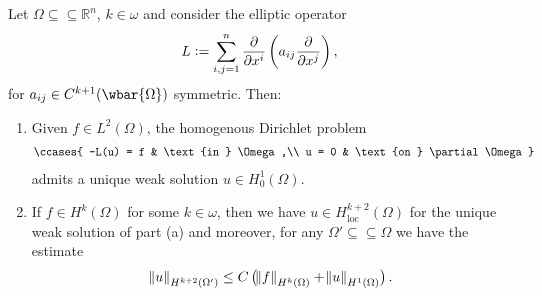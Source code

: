 \begin{theorem}
	Let $\Omega \subseteq\subseteq \mathbb{R}^n$, $k \in \omega$ and consider the elliptic operator
	\begin{equation*}
		L := \sum_{i,j = 1}^n \frac{\partial}{\partial x^i}\del[3]{a_{ij}\frac{\partial}{\partial x^j}},
	\end{equation*}
	\noindent for $a_{ij} \in C^{k + 1}(\wbar{\Omega})$ symmetric. Then:
	\begin{enumerate}[label = \textup{(}\alph*\textup{)},wide=0pt]
		\item Given $f \in L^2(\Omega)$, the homogenous Dirichlet problem
			\begin{align}
				\label{eq:HDP}
				\ccases{
					-L(u) = f & \text{in } \Omega,\\
					u = 0 & \text{on } \partial\Omega
				}
			\end{align}
			\noindent admits a unique weak solution $u \in H^1_0(\Omega)$.
		\item If $f \in H^k(\Omega)$ for some $k \in \omega$, then we have $u \in H^{k + 2}_{\mathrm{loc}}(\Omega)$ for the unique weak solution of part (a) and moreover, for any $\Omega' \subseteq \subseteq \Omega$ we have the estimate
			\begin{equation*}
				\norm{u}_{H^{k + 2}(\Omega')} \leq C\del[1]{\norm{f}_{H^k(\Omega)} + \norm{u}_{H^1(\Omega)}}.
			\end{equation*}
	\end{enumerate}
\end{theorem}

